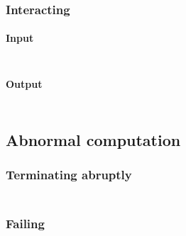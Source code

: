 \subsubsection{Interacting}\hypertarget{interacting}{}\label{interacting}

\paragraph{Input}\hypertarget{input}{}\label{input}

\begin{align*}
  [ \
  \KEY{Funcon} \quad & \NAMEHYPER{../../../../../Funcons-beta/Computations/Normal}{Interacting}{read}
  \ ]
\end{align*}
\paragraph{Output}\hypertarget{output}{}\label{output}

\begin{align*}
  [ \
  \KEY{Funcon} \quad & \NAMEHYPER{../../../../../Funcons-beta/Computations/Normal}{Interacting}{print}
  \ ]
\end{align*}
\subsection{Abnormal computation}\hypertarget{abnormal-computation}{}\label{abnormal-computation}

\subsubsection{Terminating abruptly}\hypertarget{terminating-abruptly}{}\label{terminating-abruptly}

\begin{align*}
  [ \
  \KEY{Entity} \quad & \NAMEHYPER{../../../../../Funcons-beta/Computations/Abnormal}{Abrupting}{abrupted} \\
  \KEY{Funcon} \quad & \NAMEHYPER{../../../../../Funcons-beta/Computations/Abnormal}{Abrupting}{handle-abrupt}
  \ ]
\end{align*}
\subsubsection{Failing}\hypertarget{failing}{}\label{failing}

\begin{align*}
  [ \
  \KEY{Funcon} \quad & \NAMEHYPER{../../../../../Funcons-beta/Computations/Abnormal}{Failing}{finalise-failing} \\
  \KEY{Funcon} \quad & \NAMEHYPER{../../../../../Funcons-beta/Computations/Abnormal}{Failing}{fail} \\
  \KEY{Funcon} \quad & \NAMEHYPER{../../../../../Funcons-beta/Computations/Abnormal}{Failing}{else} \\
  \KEY{Funcon} \quad & \NAMEHYPER{../../../../../Funcons-beta/Computations/Abnormal}{Failing}{checked} \\
  \KEY{Funcon} \quad & \NAMEHYPER{../../../../../Funcons-beta/Computations/Abnormal}{Failing}{check-true}
  \ ]
\end{align*}
